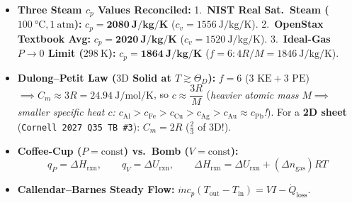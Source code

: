 \documentclass[10pt,twoside,openany,letterpaper]{book}
\begin{document}
\begin{quicksheet}
\begin{twocol}[0.52]
\begin{formulacard}
\begin{itemize}
\begin{itemize}
    \item $L_v(\SI{100}{\celsius}) = \mathbf{\SI{2256.4}{\kilo\joule\per\kilogram}} = \SI{40.65}{\kilo\joule\per\mole}$ ($\SI{539.4}{\text{cal}\per\gram}$)
    \item $L_{\mathrm{sub}}(\SI{0}{\celsius}) = L_f + L_v(\SI{0}{\celsius}) = 333.4 + 2500.9 = \mathbf{\SI{2834.3}{\kilo\joule\per\kilogram}}$
  \end{itemize}
  \item \textbf{Three Steam $c_p$ Values Reconciled:}
  1.~\textbf{NIST Real Sat.\ Steam ($\SI{100}{\celsius}, \SI{1}{\text{atm}}$):} $c_p = \mathbf{\SI{2080}{\joule\per\kilogram\per\kelvin}}$ ($c_v = \SI{1556}{\joule\per\kilogram\per\kelvin}$).
  2.~\textbf{OpenStax Textbook Avg:} $c_p = \mathbf{\SI{2020}{\joule\per\kilogram\per\kelvin}}$ ($c_v = \SI{1520}{\joule\per\kilogram\per\kelvin}$).
  3.~\textbf{Ideal-Gas $P\to 0$ Limit ($\SI{298}{\kelvin}$):} $c_p = \mathbf{\SI{1864}{\joule\per\kilogram\per\kelvin}}$ ($f=6: 4R/M = \SI{1846}{\joule\per\kilogram\per\kelvin}$).
  \item \textbf{Dulong--Petit Law ($3\text{D}$ Solid at $T \gtrsim \Theta_D$):} $f = 6$ ($3\text{ KE} + 3\text{ PE}$) $\implies \boxed{C_m \approx 3R = \SI{24.94}{\joule\per\mole\per\kelvin}}$, so $c \approx \dfrac{3R}{M}$ (\emph{heavier atomic mass $M \implies$ smaller specific heat $c$: $c_{\mathrm{Al}} > c_{\mathrm{Fe}} > c_{\mathrm{Cu}} > c_{\mathrm{Ag}} > c_{\mathrm{Au}} \approx c_{\mathrm{Pb}}$!}). For a \textbf{2D sheet} (\texttt{Cornell 2027 Q35 TB~\#3}): $C_m = 2R$ ($\frac{2}{3}$ of 3D!).
  \item \textbf{Coffee-Cup ($P=\mathrm{const}$) vs.\ Bomb ($V=\mathrm{const}$):}
  \[
    q_P = \Delta H_{\mathrm{rxn}}, \qquad q_V = \Delta U_{\mathrm{rxn}}, \qquad \boxed{\Delta H_{\mathrm{rxn}} = \Delta U_{\mathrm{rxn}} + (\Delta n_{\mathrm{gas}})RT}
  \]
  \item \textbf{Callendar--Barnes Steady Flow:} $\dot{m}c_p(T_{\mathrm{out}} - T_{\mathrm{in}}) = V I - \dot{Q}_{\mathrm{loss}}$.
\end{itemize}
\end{formulacard}
\end{twocol}


\end{quicksheet}
\end{document}
